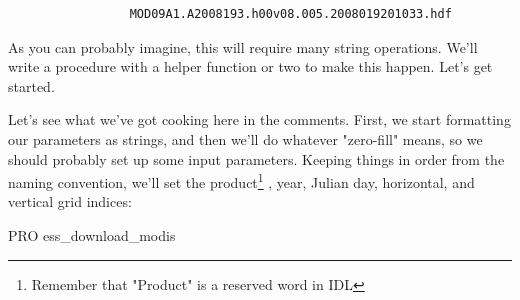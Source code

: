 \documentclass{book}
\newcommand{\codefill}{\centering$\longrightarrow$\hfill{\color{gray}\rule[0.1\baselineskip]{0.5\linewidth}{2pt}}\hfill$\longleftarrow$}
\newcounter{highlight}[page]
\newcommand{\tikzhighlightanchor}[1]{\ensuremath{\vcenter{\hbox{\tikz[remember picture, overlay]{\coordinate (#1 highlight \arabic{highlight});}}}}}
\newcommand{\bh}[0]{\stepcounter{highlight}\tikzhighlightanchor{begin}}
\newcommand{\eh}[0]{\tikzhighlightanchor{end}}
\theoremstyle{aside_style}
\begin{document}
\begin{lstlisting}
                 MOD09A1.A2008193.h00v08.005.2008019201033.hdf
\end{lstlisting}

As you can probably imagine, this will require many string operations.
We'll write a procedure with a helper function or two to make this happen. Let's get started.

\begin{idl}












\end{idl}

Let's see what we've got cooking here in the comments. First, we start formatting our parameters as strings, and then we'll do whatever "zero-fill" means,
so we should probably set up some input parameters. Keeping things in order from the naming convention,
we'll set the product\footnote{Remember that "Product" is a reserved word in IDL}
, year, Julian day, horizontal, and vertical grid indices:

\begin{idl}
PRO ess_download_modis%
\end{idl}
\end{document}
